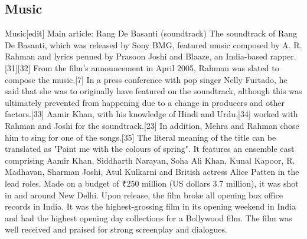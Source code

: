 \documentclass{article}
\begin{document}
\subsection{Music}
Music[edit]
Main article: Rang De Basanti (soundtrack)
The soundtrack of Rang De Basanti, which was released by Sony BMG, featured music composed by A. R. Rahman and lyrics penned by Prasoon Joshi and Blaaze, an India-based rapper.[31][32] From the film's announcement in April 2005, Rahman was slated to compose the music.[7] In a press conference with pop singer Nelly Furtado, he said that she was to originally have featured on the soundtrack, although this was ultimately prevented from happening due to a change in producers and other factors.[33] Aamir Khan, with his knowledge of Hindi and Urdu,[34] worked with Rahman and Joshi for the soundtrack.[23] In addition, Mehra and Rahman chose him to sing for one of the songs.[35]
The literal meaning of the title can be translated as "Paint me with the colours of spring". It features an ensemble cast comprising Aamir Khan, Siddharth Narayan, Soha Ali Khan, Kunal Kapoor, R. Madhavan, Sharman Joshi, Atul Kulkarni and British actress Alice Patten in the lead roles. Made on a budget of ₹250 million (US dollars 3.7 million), it was shot in and around New Delhi. Upon release, the film broke all opening box office records in India. It was the highest-grossing film in its opening weekend in India and had the highest opening day collections for a Bollywood film. The film was well received and praised for strong screenplay and dialogues.
\end{document}
